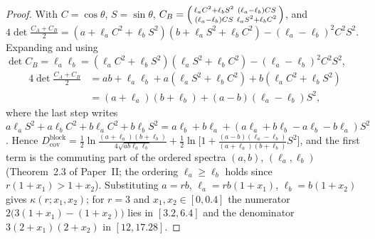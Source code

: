\documentclass[11pt,reqno]{amsart}
\theoremstyle{plain}
\theoremstyle{definition}
\theoremstyle{remark}
\numberwithin{equation}{section}
\newcommand{\Dcov}{D_{\mathrm{cov}}}
\newcommand{\CA}{C_A}
\newcommand{\CB}{C_B}
\begin{document}
\begin{proof}
With $C=\cos\theta$, $S=\sin\theta$, $\CB=\begin{psmallmatrix}\ell_aC^2+\ell_bS^2&(\ell_a-\ell_b)CS\\ (\ell_a-\ell_b)CS&\ell_aS^2+\ell_bC^2\end{psmallmatrix}$, and $4\det\frac{\CA+\CB}2=(a+\ell_aC^2+\ell_bS^2)(b+\ell_aS^2+\ell_bC^2)-(\ell_a-\ell_b)^2C^2S^2$. Expanding and using $\det\CB=\ell_a\ell_b=(\ell_aC^2+\ell_bS^2)(\ell_aS^2+\ell_bC^2)-(\ell_a-\ell_b)^2C^2S^2$,
\begin{align*}
4\det\tfrac{\CA+\CB}2&=ab+\ell_a\ell_b+a(\ell_aS^2+\ell_bC^2)+b(\ell_aC^2+\ell_bS^2)\\
&=(a+\ell_a)(b+\ell_b)+(a-b)(\ell_a-\ell_b)S^2 ,
\end{align*}
where the last step writes $a\ell_aS^2+a\ell_bC^2+b\ell_aC^2+b\ell_bS^2=a\ell_b+b\ell_a+(a\ell_a+b\ell_b-a\ell_b-b\ell_a)S^2$. Hence $\Dcov^{\mathrm{block}}=\frac12\ln\frac{(a+\ell_a)(b+\ell_b)}{4\sqrt{ab\ell_a\ell_b}}+\frac12\ln\bigl[1+\frac{(a-b)(\ell_a-\ell_b)}{(a+\ell_a)(b+\ell_b)}S^2\bigr]$, and the first term is the commuting part of the ordered spectra $(a,b)$, $(\ell_a,\ell_b)$ (Theorem~2.3 of Paper~II; the ordering $\ell_a\ge\ell_b$ holds since $r(1+x_1)>1+x_2$). Substituting $a=rb$, $\ell_a=rb(1+x_1)$, $\ell_b=b(1+x_2)$ gives $\kappa(r;x_1,x_2)$; for $r=3$ and $x_1,x_2\in[0,0.4]$ the numerator $2\bigl(3(1+x_1)-(1+x_2)\bigr)$ lies in $[3.2,6.4]$ and the denominator $3(2+x_1)(2+x_2)$ in $[12,17.28]$.
\end{proof}
\end{document}
